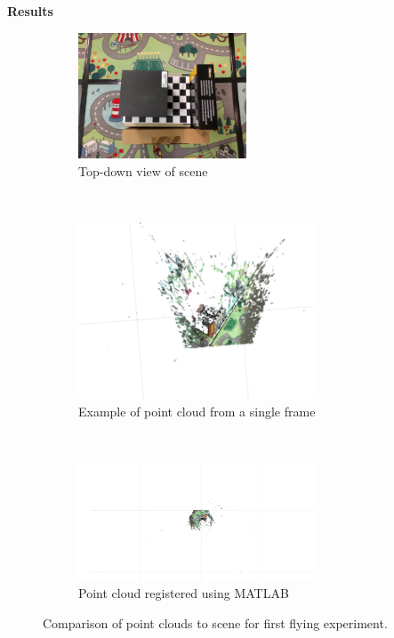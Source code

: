 \documentclass[12pt,a4paper]{article}
\begin{document}
\noindent
\textbf{Results} \\
\begin{figure}[h]
	\centering
	\begin{subfigure}[t]{0.5\textwidth}
	\centering
    \includegraphics[width=50mm, trim =110mm 70mm 110mm 110mm, clip]{setup/IMG_20180518_142317.jpg}
	\caption{Top-down view of scene}
	\label{f: e1 r2 setup}
	\end{subfigure}
	\\
	\begin{subfigure}[t]{0.5\textwidth}
	\centering
    \includegraphics[width=70mm, trim =20mm 25mm 15mm 5mm, clip]{run2_frame50.png}
	\caption{Example of point cloud from a single frame}
	\label{f: e1 r2 50}
	\end{subfigure}%
	~
	\begin{subfigure}[t]{0.5\textwidth}
	\centering
    \includegraphics[width=70mm, trim =200mm 100mm 200mm 90mm, clip]{run2_updatedworld.png}
	\caption{Point cloud registered using MATLAB}
	\label{f: e1 r2 all}
	\end{subfigure}
	\caption{Comparison of point clouds to scene for first flying experiment.}
	\label{f: e1 r2}
\end{figure}
\end{document}

